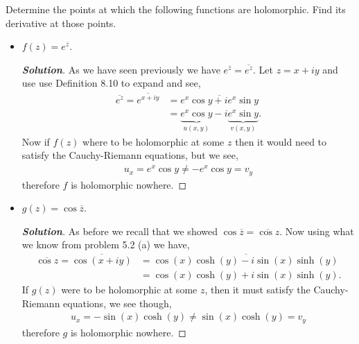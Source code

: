 \documentclass[11pt]{article}
\newenvironment{problem}[2][Problem\!]{\begin{trivlist}
\item[\hskip \labelsep {\bfseries #1}\hskip \labelsep {\bfseries #2}]}{\end{trivlist}}
\newenvironment{solution}{\begin{proof}[\textbf{\textit{Solution}}] }{\end{proof}}
\newcommand{\conj}[1]{\overline{#1}}
\begin{document}
\newpage  %

\begin{problem}{5.4}
Determine the points at which the following functions are holomorphic. Find its derivative at those points.
\begin{itemize}[itemsep=3em]
\item[(a)] $f(z) = e^{\overline{z}}$.
\begin{solution}
  As we have seen previously we have $e^{\conj z} = \conj{e^{z}}$. Let $z = x + i y$ and use use Definition 8.10 to expand and see,
  \begin{align*}
    \conj{e^{z}} = \conj{e^{x + i y}} &= \conj{e^{x}\cos y +i e^{x}  \sin y} \\
    &= \underbrace{e^{x}\cos y}_{u(x,y)} - i \underbrace{e^{x} \sin y}_{v(x,y)} .
  \end{align*}
  Now if $f(z)$ where to be holomorphic at some $z$ then it would need to satisfy the Cauchy-Riemann equations, but we see,
  \begin{align*}
    u_x = e^{x}\cos y \neq -e^{x}\cos y = v_y
  \end{align*}
  therefore $f$ is holomorphic nowhere. 

\end{solution}

\item[(b)] $g(z) = \cos\overline{z}$.
\begin{solution}
  As before we recall that we showed $\cos \conj z = \conj{\cos z}$. Now using what we know from problem 5.2 (a) we have,
  \begin{align*}
    \conj{\cos z} = \conj{\cos (x + i y)} &= \conj{\cos(x)\cosh(y) - i\sin(x)\sinh(y)} \\
    &=\cos(x)\cosh(y) + i\sin(x)\sinh(y).
  \end{align*}
  If $g(z)$ were to be holomorphic at some $z$, then it must satisfy the Cauchy-Riemann equations, we see though,
  \begin{align*}
    u_x = -\sin(x)\cosh(y) \neq \sin(x)\cosh(y) = v_y
  \end{align*}
  therefore $g$ is holomorphic nowhere. 
\end{solution}


\end{itemize}
\end{problem}
\end{document}

